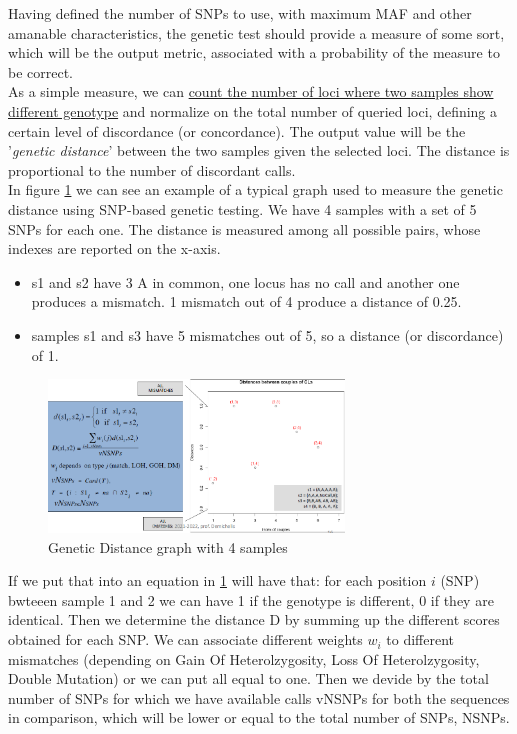 Having defined the number of SNPs to use, with maximum MAF and other amanable
characteristics, the genetic test should provide a measure of some sort, which
will be the output metric, associated with a probability of the measure to be
correct. \\

As a simple measure, we can \underline{count the number of loci where two
samples show different genotype} and normalize on the total number of queried
loci, defining a certain level of discordance (or concordance). The output value
will be the '\textit{genetic distance}' between the two samples given the
selected loci. The distance is proportional to the number of discordant calls.
\\

In figure \ref{fig:Distance} we can see an example of a typical graph used to
measure the genetic distance using SNP-based genetic testing. We have 4 samples
with a set of 5 SNPs for each one. The distance is measured among all possible
pairs, whose indexes are reported on the x-axis. 

\begin{itemize}
	\item s1 and s2 have 3 A in common, one locus has no call and another one
	produces a mismatch. 1 mismatch out of 4 produce a distance of 0.25.
	\item samples s1 and s3 have 5 mismatches out of 5, so a distance (or
	discordance) of 1. 
\end{itemize}


\begin{figure}[H]
	\centering
	\includegraphics[width=0.7\textwidth]{Distance.PNG}
	\caption{Genetic Distance graph with 4 samples}
	\label{fig:Distance} %
\end{figure}

If we put that into an equation in \ref{fig:Distance} will have that: for each
position $i$ (SNP) bwteeen sample 1 and 2 we can have 1 if the genotype is
different, 0 if they are identical. Then we determine the distance D by summing
up the different scores obtained for each SNP. We can associate different
weights $w_i$ to different mismatches (depending on Gain Of Heterolzygosity,
Loss Of Heterolzygosity, Double Mutation) or we can put all equal to one. Then
we devide by the total number of SNPs for which we have available calls vNSNPs
for both the sequences in comparison, which will be lower or equal to the total
number of SNPs, NSNPs. 


